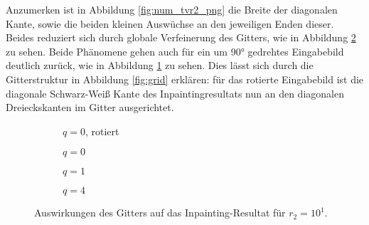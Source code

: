 \documentclass{mythesis}
\begin{document}




Anzumerken ist in Abbildung \ref{fig:num_tvr2_png} die Breite der diagonalen Kante, sowie die beiden kleinen Auswüchse an den jeweiligen Enden dieser.
Beides reduziert sich durch globale Verfeinerung des Gitters, wie in Abbildung \ref{fig:num_tvrefine_png} zu sehen.
Beide Phänomene gehen auch für ein um 90° gedrehtes Eingabebild deutlich zurück, wie in Abbildung \ref{fig:num_tvgrid} zu sehen.
Dies lässt sich durch die Gitterstruktur in Abbildung \ref{fig:grid} erklären: für das rotierte Eingabebild ist die diagonale Schwarz-Weiß Kante des Inpaintingresultats nun an den diagonalen Dreieckskanten im Gitter ausgerichtet.

\begin{figure}[ht]
    \centering
    \begin{subfigure}{0.2\textwidth}
	\centering
	\caption{$q=0$, rotiert}
	\label{fig:num_tvgrid}
    \end{subfigure}%
    \begin{subfigure}{0.2\textwidth}
	\centering
	\caption{$q=0$}
    \end{subfigure}%
    \begin{subfigure}{0.2\textwidth}
	\centering
	\caption{$q=1$}
    \end{subfigure}%
    \begin{subfigure}{0.2\textwidth}
	\centering
	\caption{$q=4$}
    \end{subfigure}%
    \caption{Auswirkungen des Gitters auf das Inpainting-Resultat für $r_2=10^1$.}
    \label{fig:num_tvrefine_png}
\end{figure}
\end{document}
